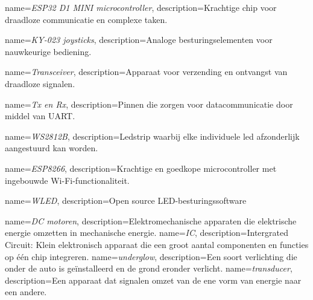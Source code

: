 {
    name=\textit{ESP32 D1 MINI microcontroller},
    description={Krachtige chip voor draadloze communicatie en complexe taken.}
}

{
    name=\textit{KY-023 joysticks},
    description={Analoge besturingselementen voor nauwkeurige bediening.}
}

{
    name=\textit{Transceiver},
    description={Apparaat voor verzending en ontvangst van draadloze signalen.}
}

{
    name=\textit{Tx en Rx},
    description={Pinnen die zorgen voor datacommunicatie door middel van UART.}
}

{
    name=\textit{WS2812B},
    description={Ledstrip waarbij elke individuele led afzonderlijk aangestuurd kan worden.}
}

{
    name=\textit{ESP8266},
    description={Krachtige en goedkope microcontroller met ingebouwde Wi-Fi-functionaliteit.}
}

{
    name=\textit{WLED},
    description={Open source LED-besturingssoftware}
}

{
    name=\textit{DC motoren},
    description={Elektromechanische apparaten die elektrische energie omzetten in mechanische energie.}
}
{
    name=\textit{IC},
    description={Intergrated Circuit: Klein elektronisch apparaat die een groot aantal componenten en functies op één chip integreren.}
}
{
    name=\textit{underglow},
    description={Een soort verlichting die onder de auto is geïnstalleerd en de grond eronder verlicht.}
}
{
    name=\textit{transducer},
    description={Een apparaat dat signalen omzet van de ene vorm van energie naar een andere.}
}
